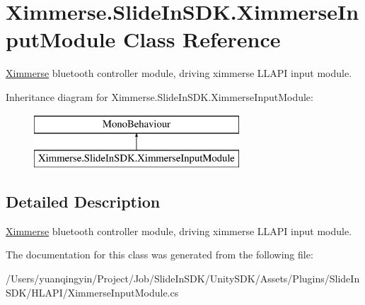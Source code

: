 \hypertarget{class_ximmerse_1_1_slide_in_s_d_k_1_1_ximmerse_input_module}{}\section{Ximmerse.\+Slide\+In\+S\+D\+K.\+Ximmerse\+Input\+Module Class Reference}
\label{class_ximmerse_1_1_slide_in_s_d_k_1_1_ximmerse_input_module}


\mbox{\hyperlink{namespace_ximmerse}{Ximmerse}} bluetooth controller module, driving ximmerse L\+L\+A\+PI input module.  


Inheritance diagram for Ximmerse.\+Slide\+In\+S\+D\+K.\+Ximmerse\+Input\+Module\+:\begin{figure}[H]
\begin{center}
\leavevmode
\includegraphics[height=2.000000cm]{class_ximmerse_1_1_slide_in_s_d_k_1_1_ximmerse_input_module}
\end{center}
\end{figure}


\subsection{Detailed Description}
\mbox{\hyperlink{namespace_ximmerse}{Ximmerse}} bluetooth controller module, driving ximmerse L\+L\+A\+PI input module. 



The documentation for this class was generated from the following file\+:\begin{DoxyCompactItemize}
\item 
/\+Users/yuanqingyin/\+Project/\+Job/\+Slide\+In\+S\+D\+K/\+Unity\+S\+D\+K/\+Assets/\+Plugins/\+Slide\+In\+S\+D\+K/\+H\+L\+A\+P\+I/Ximmerse\+Input\+Module.\+cs\end{DoxyCompactItemize}
